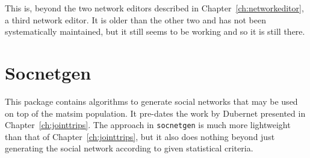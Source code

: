 

This is, beyond the two network editors described in Chapter~\ref{ch:networkeditor}, a third network editor. 
It is older than the other two and has not been systematically maintained, but it still seems to be working and so it is still there.

\section{Socnetgen}
\label{sec:contrib-socnetgen}



This package contains algorithms to generate social networks that may be used on top of the \gls{matsim} population.  It pre-dates the work by Dubernet presented in Chapter~\ref{ch:jointtrips}.  The approach in \lstinline{socnetgen} is much more lightweight than that of Chapter~\ref{ch:jointtrips}, but it also does nothing beyond just generating the social network according to given statistical criteria.


